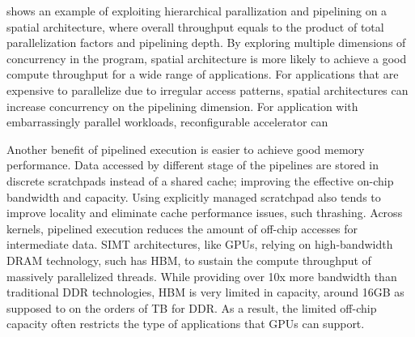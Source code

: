  shows an example of exploiting hierarchical parallization and pipelining on
a spatial architecture, where overall throughput equals to the product of total parallelization factors 
and pipelining depth.
By exploring multiple dimensions of concurrency in the program, spatial architecture is more likely
to achieve a good compute throughput for a wide range of applications.
For applications that are expensive to parallelize due to irregular access patterns, spatial
architectures can increase concurrency on the pipelining dimension.  For application with
embarrassingly parallel workloads, reconfigurable accelerator can 

Another benefit of pipelined execution is easier to achieve good memory performance.
Data accessed by different stage of the pipelines are stored in discrete scratchpads 
instead of a shared cache; improving the effective on-chip bandwidth and capacity.
Using explicitly managed scratchpad also tends to improve locality and 
eliminate cache performance issues, such thrashing.
Across kernels, pipelined execution reduces the amount of off-chip accesses for intermediate
data.
SIMT architectures, like GPUs, relying on high-bandwidth DRAM technology, such has HBM, to sustain
the compute throughput of massively parallelized threads.
While providing over 10x more bandwidth than traditional DDR technologies, HBM is very limited in
capacity, around 16GB as supposed to on the orders of TB for DDR.
As a result, the limited off-chip capacity often restricts the type of applications that
GPUs can support.


